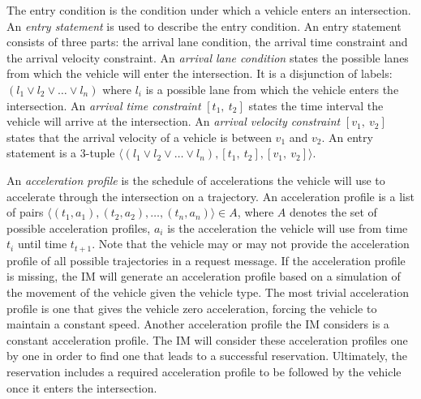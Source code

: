 The entry condition is the condition under which a vehicle enters an
intersection.  An \emph{entry statement} is used to describe the entry
condition. An entry statement consists of three parts: the arrival
lane condition, the arrival time constraint and the arrival velocity
constraint.  An \emph{arrival lane condition} states the possible lanes
from which the vehicle will enter the intersection.  It is a disjunction of
labels: $(l_1 \vee l_2 \vee \ldots \vee l_n)$ where $l_i$ is a
possible lane from which the vehicle enters the intersection.  An
\emph{arrival time constraint} $[t_1,\ t_2]$ states the time interval
the vehicle will arrive at the intersection.  An \emph{arrival
velocity constraint} $[v_1,\ v_2]$ states that the arrival velocity of
a vehicle is between $v_1$ and $v_2$.  An entry statement is a
$3$-tuple $\langle (l_1 \vee l_2 \vee \ldots \vee l_n), [t_1,\ t_2],
[v_1,\ v_2] \rangle$.

An \emph{acceleration profile} is the schedule of accelerations the
vehicle will use to accelerate through the intersection on a
trajectory. An acceleration profile is a list of pairs $\langle (t_1,
a_1), (t_2, a_2), \ldots, (t_n, a_n) \rangle \in A$, where $A$ denotes
the set of possible acceleration profiles, $a_i$ is the acceleration
the vehicle will use from time $t_i$ until time $t_{t+1}$.  Note that
the vehicle may or may not provide the acceleration profile of all
possible trajectories in a request message.  If the acceleration
profile is missing, the IM will generate an acceleration profile based
on a simulation of the movement of the vehicle given the vehicle type.
The most trivial acceleration profile is one that gives the vehicle
zero acceleration, forcing the vehicle to maintain a constant speed.
Another acceleration profile the IM considers is a constant
acceleration profile.  The IM will consider these acceleration
profiles one by one in order to find one that leads to a successful
reservation.  Ultimately, the reservation includes a required
acceleration profile to be followed by the vehicle once it enters the
intersection.



